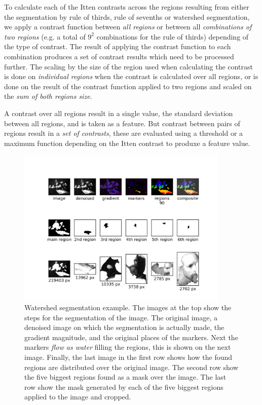 \documentclass[11pt,a4paper,twoside,openright,draft]{report}
\begin{document}
\begin{multicols}{2}
To calculate each of the Itten contrasts across the regions resulting from
either the segmentation by rule of thirds, rule of sevenths or watershed
segmentation, we apply a contrast function between \emph{all regions} or
between all \emph{combinations of two regions} (e.g. a total of $9^2$
combinations for the rule of thirds) depending of the type of contrast.  The
result of applying the contrast function to each combination produces a set of
contrast results which need to be processed further.  The scaling by the size
of the region used when calculating the contrast is done on \emph{individual
regions} when the contrast is calculated over all regions, or is done on the
result of the contrast function applied to two regions and scaled on the
\emph{sum of both regions size}.

A contrast over all regions result in a single value, the standard deviation
between all regions, and is taken as a feature.  But contrast between pairs of
regions result in a \emph{set of contrasts}, these are evaluated using a
threshold or a maximum function depending on the Itten contrast to produxe a
feature value.

\begin{figure}
\centering
\includegraphics[width=0.9\textwidth]{segm_rembrandt_eu_464}
\caption[Watershed segmentation example]{Watershed segmentation example.  The
images at the top show the steps for the segmentation of the image.  The
original image, a denoised image on which the segmentation is actually made,
the gradient magnitude, and the original places of the markers.  Next the
markers \emph{flow as water} filling the regions, this is shown on the next
image.  Finally, the last image in the first row shows how the found regions
are distributed over the original image.  The second row show the five biggest
regions found as a mask over the image.  The last row show the mask generated
by each of the five biggest regions applied to the image and cropped.}
\label{fig:segm}
\end{figure}


\end{multicols}
\end{document}
